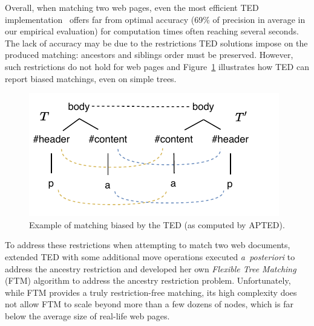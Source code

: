 Overall, when matching two web pages, even the most efficient TED implementation~\cite{pawlik2016tree} offers far from optimal accuracy (69\% of precision in average in our empirical evaluation) for computation times often reaching several seconds.
The lack of accuracy may be due to the restrictions TED solutions impose on the produced matching: ancestors and siblings order must be preserved.
However, such restrictions do not hold for web pages and Figure~\ref{sftm:fig:ted_mistake} illustrates how TED can report biased matchings, even on simple trees.

\begin{figure}
    \centering
	\includegraphics[width=.65\linewidth]{tree-matching/explanation/rted_mistake}
    \caption{Example of matching biased by the TED (as computed by APTED).}
    \label{sftm:fig:ted_mistake}
\end{figure}

To address these restrictions when attempting to match two web documents, \cite{fokaefs2011empirical} extended TED with some additional move operations executed \emph{a~posteriori} to address the ancestry restriction and \cite{Kumar2011_FTM,Kumar2011_Bricolage} developed her own \emph{Flexible Tree Matching} (FTM) algorithm to address the ancestry restriction problem.
Unfortunately, while FTM provides a truly restriction-free matching, its high complexity does not allow FTM to scale beyond more than a few dozens of nodes, which is far below the average size of real-life web pages.



